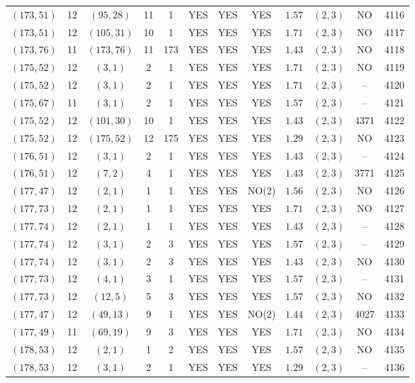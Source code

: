 \begin{longtable}{|c|c|c|c|c|c|c|c|c|c|c|c|}
$(173,51)$ & 12 & $(95,28)$ & 11 & 1 & YES & YES & YES & $1.57$ & $(2,3)$ & NO & 4116\\
$(173,51)$ & 12 & $(105,31)$ & 10 & 1 & YES & YES & YES & $1.71$ & $(2,3)$ & NO & 4117\\
$(173,76)$ & 11 & $(173,76)$ & 11 & 173 & YES & YES & YES & $1.43$ & $(2,3)$ & NO & 4118\\
$(175,52)$ & 12 & $(3,1)$ & 2 & 1 & YES & YES & YES & $1.71$ & $(2,3)$ & NO & 4119\\
$(175,52)$ & 12 & $(3,1)$ & 2 & 1 & YES & YES & YES & $1.71$ & $(2,3)$ & -- & 4120\\
$(175,67)$ & 11 & $(3,1)$ & 2 & 1 & YES & YES & YES & $1.57$ & $(2,3)$ & -- & 4121\\
$(175,52)$ & 12 & $(101,30)$ & 10 & 1 & YES & YES & YES & $1.43$ & $(2,3)$ & 4371 & 4122\\
$(175,52)$ & 12 & $(175,52)$ & 12 & 175 & YES & YES & YES & $1.29$ & $(2,3)$ & NO & 4123\\
$(176,51)$ & 12 & $(3,1)$ & 2 & 1 & YES & YES & YES & $1.43$ & $(2,3)$ & -- & 4124\\
$(176,51)$ & 12 & $(7,2)$ & 4 & 1 & YES & YES & YES & $1.43$ & $(2,3)$ & 3771 & 4125\\
$(177,47)$ & 12 & $(2,1)$ & 1 & 1 & YES & YES & NO(2) & $1.56$ & $(2,3)$ & NO & 4126\\
$(177,73)$ & 12 & $(2,1)$ & 1 & 1 & YES & YES & YES & $1.71$ & $(2,3)$ & NO & 4127\\
$(177,74)$ & 12 & $(2,1)$ & 1 & 1 & YES & YES & YES & $1.43$ & $(2,3)$ & -- & 4128\\
$(177,74)$ & 12 & $(3,1)$ & 2 & 3 & YES & YES & YES & $1.57$ & $(2,3)$ & -- & 4129\\
$(177,74)$ & 12 & $(3,1)$ & 2 & 3 & YES & YES & YES & $1.43$ & $(2,3)$ & NO & 4130\\
$(177,73)$ & 12 & $(4,1)$ & 3 & 1 & YES & YES & YES & $1.57$ & $(2,3)$ & -- & 4131\\
$(177,73)$ & 12 & $(12,5)$ & 5 & 3 & YES & YES & YES & $1.57$ & $(2,3)$ & NO & 4132\\
$(177,47)$ & 12 & $(49,13)$ & 9 & 1 & YES & YES & NO(2) & $1.44$ & $(2,3)$ & 4027 & 4133\\
$(177,49)$ & 11 & $(69,19)$ & 9 & 3 & YES & YES & YES & $1.71$ & $(2,3)$ & NO & 4134\\
$(178,53)$ & 12 & $(2,1)$ & 1 & 2 & YES & YES & YES & $1.57$ & $(2,3)$ & NO & 4135\\
$(178,53)$ & 12 & $(3,1)$ & 2 & 1 & YES & YES & YES & $1.29$ & $(2,3)$ & -- & 4136\\

\end{longtable}
